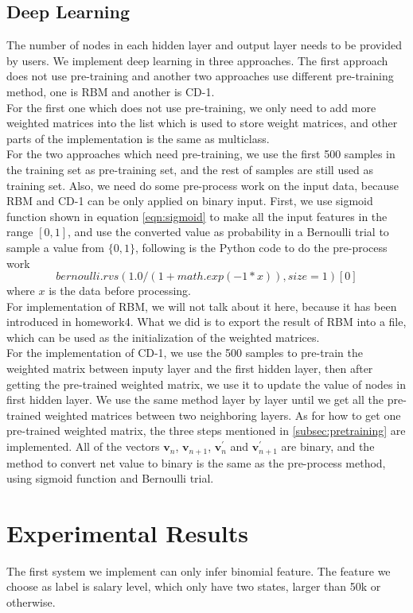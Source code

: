 \documentclass[11pt,letterpaper]{article}
\begin{document}
\subsection{Deep Learning}
The number of nodes in each hidden layer and output layer needs to be provided by users. We implement deep learning in three approaches. The first approach does not use pre-training and another two approaches use different pre-training method, one is RBM and another is CD-1. \\
For the first one which does not use pre-training, we only need to add more weighted matrices into the list which is used to store weight matrices, and other parts of the implementation is the same as multiclass.\\
For the two approaches which need pre-training, we use the first 500 samples in the training set as pre-training set, and the rest of samples are still used as training set. Also, we need do some pre-process work on the input data, because RBM and CD-1 can be only applied on binary input. First, we use sigmoid function shown in equation \ref{eqn:sigmoid} to make all the input features in the range $[0, 1]$, and use the converted value as probability in a Bernoulli trial to sample a value from $\{0, 1\}$, following is the Python code to do the pre-process work 
$$bernoulli.rvs(1.0/(1 + math.exp(-1 * x)), size=1)[0]$$
where $x$ is the data before processing. \\
For implementation of RBM, we will not talk about it here, because it has been introduced in homework4. What we did is to export the result of RBM into a file, which can be used as the initialization of the weighted matrices. \\
For the implementation of CD-1, we use the 500 samples to pre-train the weighted matrix between inputy layer and the first hidden layer, then after getting the pre-trained weighted matrix, we use it to update the value of nodes in first hidden layer. We use the same method layer by layer until we get all the pre-trained weighted matrices between two neighboring layers. As for how to get one pre-trained weighted matrix, the three steps mentioned in \ref{subsec:pretraining} are implemented. All of the vectors $\mathbf{v}_n$, $\mathbf{v}_{n+1}$, $\mathbf{v}^{\prime}_n$ and $\mathbf{v}^{\prime}_{n+1}$ are binary, and the method to convert net value to binary is the same as the pre-process method, using sigmoid function and Bernoulli trial. 

\section{Experimental Results}
The first system we implement can only infer binomial feature. The feature we choose as label is salary level, which only have two states, larger than 50k or otherwise. 
\end{document}
